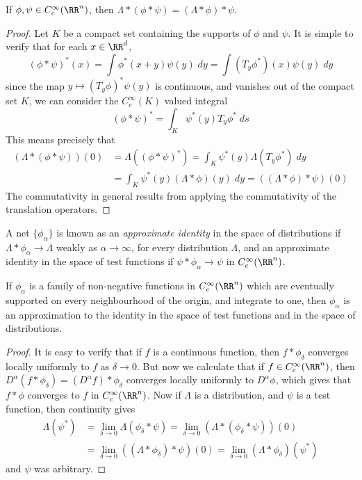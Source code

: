 \begin{theorem}
    If $\phi, \psi \in C_c^\infty(\RR^n)$, then $\Lambda * (\phi * \psi) = (\Lambda * \phi) * \psi$.
\end{theorem}
\begin{proof}
  Let $K$ be a compact set containing the supports of $\phi$ and $\psi$. It is simple to verify that for each $x \in \RR^d$,
    \[ (\phi * \psi)^*(x) = \int \phi^*(x + y) \psi(y)\; dy = \int (T_y \phi^*)(x) \psi(y)\; dy \]
    since the map $y \mapsto (T_y \phi)^* \psi(y)$ is continuous, and vanishes out of the compact set $K$, we can consider the $C_c^\infty(K)$ valued integral
    \[ (\phi * \psi)^* = \int_K \psi^*(y) T_y \phi^*\; ds \]
    This means precisely that
    \begin{align*}
        (\Lambda * (\phi * \psi))(0) &= \Lambda((\phi * \psi)^*) = \int_K \psi^*(y) \Lambda(T_y \phi^*)\; dy\\
        &= \int_K \psi^*(y) (\Lambda * \phi)(y)\; dy = ((\Lambda * \phi) * \psi)(0)
    \end{align*}
    The commutativity in general results from applying the commutativity of the translation operators.
\end{proof}

A net $\{ \phi_\alpha \}$ is known as an {\it approximate identity} in the space of distributions if $\Lambda * \phi_\alpha \to \Lambda$ weakly as $\alpha \to \infty$, for every distribution $\Lambda$, and an approximate identity in the space of test functions if $\psi * \phi_\alpha \to \psi$ in $C_c^\infty(\RR^n)$.

\begin{theorem}
    If $\phi_\alpha$ is a family of non-negative functions in $C_c^\infty(\RR^n)$ which are eventually supported on every neighbourhood of the origin, and integrate to one, then $\phi_\alpha$ is an approximation to the identity in the space of test functions and in the space of distributions.
\end{theorem}
\begin{proof}
    It is easy to verify that if $f$ is a continuous function, then $f * \phi_\delta$ converges locally uniformly to $f$ as $\delta \to 0$. But now we calculate that if $f \in C_c^\infty(\RR^n)$, then $D^\alpha(f * \phi_\delta) = (D^\alpha f) * \phi_\delta$ converges locally uniformly to $D^\alpha \phi$, which gives that $f * \phi$ converges to $f$ in $C_c^\infty(\RR^n)$. Now if $\Lambda$ is a distribution, and $\psi$ is a test function, then continuity gives
    \begin{align*}
        \Lambda(\psi^*) &= \lim_{\delta \to 0} \Lambda(\phi_\delta * \psi) = \lim_{\delta \to 0} (\Lambda * (\phi_\delta * \psi))(0)\\
        &= \lim_{\delta \to 0} ((\Lambda * \phi_\delta) * \psi)(0) = \lim_{\delta \to 0} (\Lambda * \phi_\delta)(\psi^*)
    \end{align*}
    and $\psi$ was arbitrary.
\end{proof}

